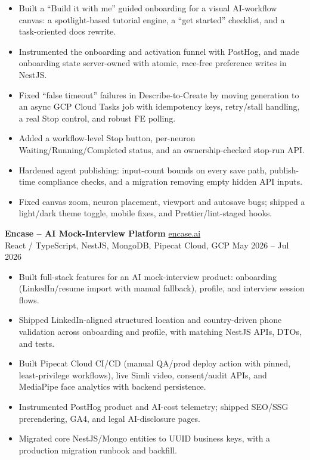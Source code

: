 \documentclass[a4paper,11pt]{article}
\newcommand{\resumeProject}[4]{
    \item
    \textbf{#1} \hfill {\footnotesize #3} \\
    \footnotesize #2 \hfill {\footnotesize #4}
    \vspace{-2mm}
}
\newcommand{\resumeItemListStart}{
    \begin{itemize}[leftmargin=3ex, itemsep=0mm, label=$\vcenter{\hbox{\tiny$\bullet$}}$]\small
}
\newcommand{\resumeItemListEnd}{\end{itemize}\vspace{-2mm}}
\begin{document}
    \resumeItemListStart
        \item Built a ``Build it with me'' guided onboarding for a visual AI-workflow canvas: a spotlight-based tutorial engine, a ``get started'' checklist, and a task-oriented docs rewrite.
        \item Instrumented the onboarding and activation funnel with PostHog, and made onboarding state server-owned with atomic, race-free preference writes in NestJS.
        \item Fixed ``false timeout'' failures in Describe-to-Create by moving generation to an async GCP Cloud Tasks job with idempotency keys, retry/stall handling, a real Stop control, and robust FE polling.
        \item Added a workflow-level Stop button, per-neuron Waiting/Running/Completed status, and an ownership-checked stop-run API.
        \item Hardened agent publishing: input-count bounds on every save path, publish-time compliance checks, and a migration removing empty hidden API inputs.
        \item Fixed canvas zoom, neuron placement, viewport and autosave bugs; shipped a light/dark theme toggle, mobile fixes, and Prettier/lint-staged hooks.
    \resumeItemListEnd

    \resumeProject
        {Encase \textnormal{-- AI Mock-Interview Platform}}
        {React / TypeScript, NestJS, MongoDB, Pipecat Cloud, GCP}
        {\href{https://encase.ai}{encase.ai}}
        {May 2026 -- Jul 2026}

    \resumeItemListStart
        \item Built full-stack features for an AI mock-interview product: onboarding (LinkedIn/resume import with manual fallback), profile, and interview session flows.
        \item Shipped LinkedIn-aligned structured location and country-driven phone validation across onboarding and profile, with matching NestJS APIs, DTOs, and tests.
        \item Built Pipecat Cloud CI/CD (manual QA/prod deploy action with pinned, least-privilege workflows), live Simli video, consent/audit APIs, and MediaPipe face analytics with backend persistence.
        \item Instrumented PostHog product and AI-cost telemetry; shipped SEO/SSG prerendering, GA4, and legal AI-disclosure pages.
        \item Migrated core NestJS/Mongo entities to UUID business keys, with a production migration runbook and backfill.
    \resumeItemListEnd
\end{document}
